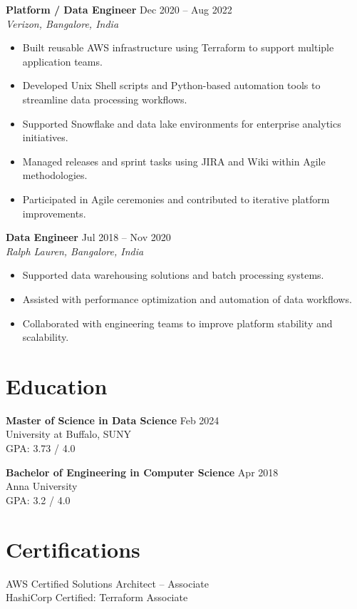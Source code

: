 \documentclass[10pt]{article}
\begin{document}
\textbf{Platform / Data Engineer} \hfill Dec 2020 -- Aug 2022 \\
\textit{Verizon, Bangalore, India}
\begin{itemize}[leftmargin=*, itemsep=3pt]
    \item Built reusable AWS infrastructure using Terraform to support multiple application teams.
    \item Developed Unix Shell scripts and Python-based automation tools to streamline data processing workflows.
    \item Supported Snowflake and data lake environments for enterprise analytics initiatives.
    \item Managed releases and sprint tasks using JIRA and Wiki within Agile methodologies.
    \item Participated in Agile ceremonies and contributed to iterative platform improvements.
\end{itemize}

\textbf{Data Engineer} \hfill Jul 2018 -- Nov 2020 \\
\textit{Ralph Lauren, Bangalore, India}
\begin{itemize}[leftmargin=*, itemsep=3pt]
    \item Supported data warehousing solutions and batch processing systems.
    \item Assisted with performance optimization and automation of data workflows.
    \item Collaborated with engineering teams to improve platform stability and scalability.
\end{itemize}

\section*{Education}

\textbf{Master of Science in Data Science} \hfill Feb 2024 \\
University at Buffalo, SUNY \\
GPA: 3.73 / 4.0

\textbf{Bachelor of Engineering in Computer Science} \hfill Apr 2018 \\
Anna University \\
GPA: 3.2 / 4.0

\section*{Certifications}
AWS Certified Solutions Architect – Associate \\
HashiCorp Certified: Terraform Associate
\end{document}
